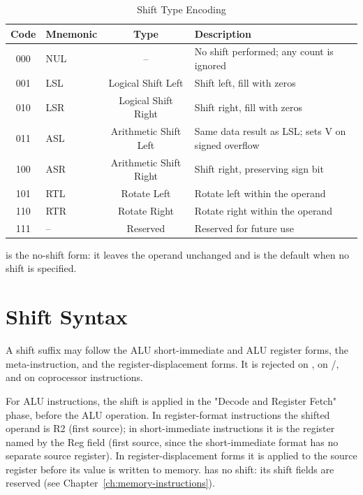 \begin{table}[H]
	\centering
	\begin{tabular}{clcp{7cm}}
		\toprule
		\textbf{Code} & \textbf{Mnemonic} & \textbf{Type}          & \textbf{Description}                               \\
		\midrule
		000           & NUL               & --                     & No shift performed; any count is ignored           \\
		001           & LSL               & Logical Shift Left     & Shift left, fill with zeros                        \\
		010           & LSR               & Logical Shift Right    & Shift right, fill with zeros                       \\
		011           & ASL               & Arithmetic Shift Left  & Same data result as LSL; sets V on signed overflow \\
		100           & ASR               & Arithmetic Shift Right & Shift right, preserving sign bit                   \\
		101           & RTL               & Rotate Left            & Rotate left within the operand                     \\
		110           & RTR               & Rotate Right           & Rotate right within the operand                    \\
		111           & --                & Reserved               & Reserved for future use                            \\
		\bottomrule
	\end{tabular}
	\caption{Shift Type Encoding}
	\label{tab:shift-encoding}
	\label{tab:shift-types}
\end{table}

 is the no-shift form: it leaves the operand unchanged and is the default when no shift is specified.

\section{Shift Syntax}

A shift suffix may follow the ALU short-immediate and ALU register forms, the  meta-instruction, and the
register-displacement  forms. It is rejected on , on
/, and on coprocessor instructions.

For ALU instructions, the shift is applied in the "Decode and Register Fetch" phase, before the ALU operation. In
register-format instructions the shifted operand is R2 (first source); in short-immediate instructions it is the
register named by the Reg field (first source, since the short-immediate format has no separate source register). In
register-displacement  forms it is applied to the source register before its value is written to memory.
 has no shift: its shift fields are reserved (see Chapter~\ref{ch:memory-instructions}).

